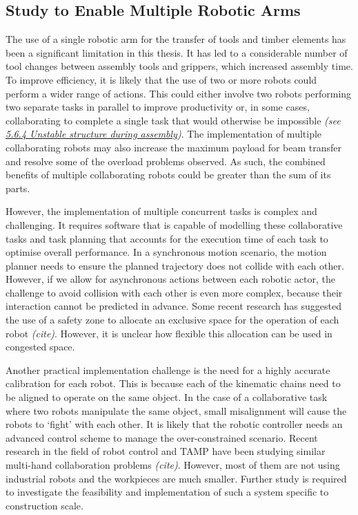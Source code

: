 \subsection{Study to Enable Multiple Robotic Arms}
\label{subsection:study_to_enable_multiple_robots
}
The use of a single robotic arm for the transfer of tools and timber elements has been a significant limitation in this thesis. It has led to a considerable number of tool changes between assembly tools and grippers, which increased assembly time. To improve efficiency, it is likely that the use of two or more robots could perform a wider range of actions. This could either involve two robots performing two separate tasks in parallel to improve productivity or, in some cases, collaborating to complete a single task that would otherwise be impossible \textit{(see \ul{5.6.4 Unstable structure during assembly})}. The implementation of multiple collaborating robots may also increase the maximum payload for beam transfer and resolve some of the overload problems observed. As such, the combined benefits of multiple collaborating robots could be greater than the sum of its parts.

However, the implementation of multiple concurrent tasks is complex and challenging. It requires software that is capable of modelling these collaborative tasks and task planning that accounts for the execution time of each task to optimise overall performance. In a synchronous motion scenario, the motion planner needs to ensure the planned trajectory does not collide with each other. However, if we allow for asynchronous actions between each robotic actor, the challenge to avoid collision with each other is even more complex, because their interaction cannot be predicted in advance. Some recent research has suggested the use of a safety zone to allocate an exclusive space for the operation of each robot \textit{(cite)}. However, it is unclear how flexible this allocation can be used in congested space.

Another practical implementation challenge is the need for a highly accurate calibration for each robot. This is because each of the kinematic chains need to be aligned to operate on the same object. In the case of a collaborative task where two robots manipulate the same object, small misalignment will cause the robots to ‘fight’ with each other. It is likely that the robotic controller needs an advanced control scheme to manage the over-constrained scenario. Recent research in the field of robot control and TAMP have been studying similar multi-hand collaboration problems \textit{(cite)}. However, most of them are not using industrial robots and the workpieces are much smaller. Further study is required to investigate the feasibility and implementation of such a system specific to construction scale. 

